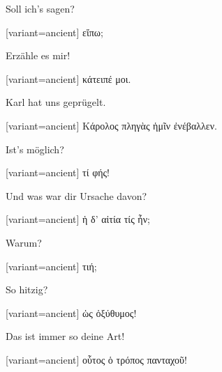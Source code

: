 Soll ich's sagen?

\switchcolumn

\begin{greek}[variant=ancient]%
εἴπω;

\end{greek}%
\switchcolumn*

Erzähle es mir!

\switchcolumn

\begin{greek}[variant=ancient]%
κάτειπέ μοι.

\end{greek}%
\switchcolumn*

Karl hat uns geprügelt.

\switchcolumn

\begin{greek}[variant=ancient]%
Κάρολος πληγὰς ἡμῖν ἐνέβαλλεν.

\end{greek}%
\switchcolumn*

Ist's möglich?

\switchcolumn

\begin{greek}[variant=ancient]%
τί φής!

\end{greek}%
\switchcolumn*

Und was war dir Ursache davon?

\switchcolumn

\begin{greek}[variant=ancient]%
ἡ δ’ αἰτία τίς ἦν;

\end{greek}%
\switchcolumn*

Warum?

\switchcolumn

\begin{greek}[variant=ancient]%
τιή;

\end{greek}%
\switchcolumn*

So hitzig?

\switchcolumn

\begin{greek}[variant=ancient]%
ὡς ὀξύθυμος!

\end{greek}%
\switchcolumn*

Das ist immer so deine Art!

\switchcolumn

\begin{greek}[variant=ancient]%
οὗτος ὁ τρόπος πανταχοῦ!

\end{greek}%
\switchcolumn*

